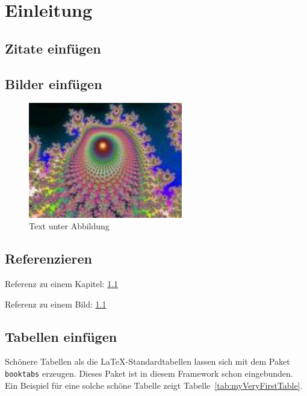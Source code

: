 \chapter{Einleitung}

\section{Zitate einfügen}\label{sec:citation}
\cite{lammel2008google}
\cite{lammel2015software}

\section{Bilder einfügen}
\begin{figure}[h]
	\centering
	\includegraphics[width=0.60\textwidth]{images/image.jpg}
	\caption[Text im Abbildungsverzeichnis]{Text unter Abbildung}
	\label{fig:image}
\end{figure}

\section{Referenzieren}
Referenz zu einem Kapitel: \ref{sec:citation}

Referenz zu einem Bild: \ref{fig:image}

\section{Tabellen einfügen}

Schönere Tabellen als die \LaTeX-Standardtabellen lassen sich mit dem Paket {\tt booktabs} erzeugen. Dieses Paket ist in diesem Framework schon eingebunden. Ein Beispiel für eine solche schöne Tabelle zeigt Tabelle~\ref{tab:myVeryFirstTable}.

